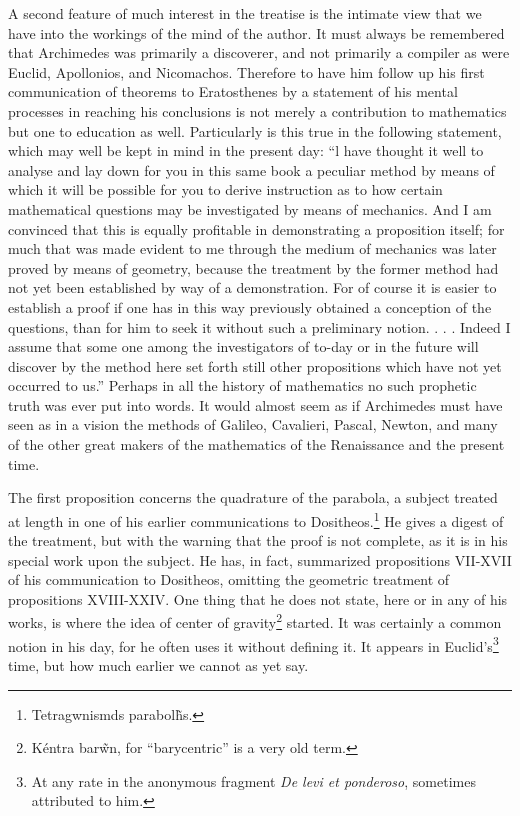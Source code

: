 \documentclass[12pt]{article}
\begin{document}
A second feature of much interest in the treatise is the intimate view
that we have into the workings of the mind of the author. It must
always be remembered that Archimedes was primarily a discoverer, and
not primarily a compiler as were Euclid, Apollonios, and Nicomachos.
Therefore to have him follow up his first communication of theorems to
Eratosthenes by a statement of his mental processes in reaching his
conclusions is not merely a contribution to mathematics but one to
education as well. Particularly is this true in the following
statement, which may well be kept in mind in the present day: ``l have
thought it well to analyse and lay down for you in this same book a
peculiar method by means of which it will be possible for you to
derive instruction as to how certain mathematical questions may be
investigated by means of mechanics. And I am convinced that this is
equally profitable in demonstrating a proposition itself; for much
that was made evident to me through the medium of mechanics was later
proved by means of geometry, because the treatment by the former
method had not yet been established by way of a demonstration. For of
course it is easier to establish a proof if one has in this way
previously obtained a conception of the questions, than for him to
seek it without such a preliminary notion. .  . . Indeed I assume that
some one among the investigators of to-day or in the future will
discover by the method here set forth still other propositions which
have not yet occurred to us.'' Perhaps in all the history of
mathematics no such prophetic truth was ever put into words.  It would
almost seem as if Archimedes must have seen as in a vision the methods
of Galileo, Cavalieri, Pascal, Newton, and many of the other great
makers of the mathematics of the Renaissance and the present time.

The first proposition concerns the quadrature of the parabola, a
subject treated at length in one of his earlier communications to
Dositheos.\footnote{ Tetragwnismds parabol\~hs.}
He gives a digest of the treatment, but with the warning that the
proof is not complete, as it is in his special work upon the
subject. He has, in fact, summarized propositions VII-XVII of his
communication to Dositheos, omitting the geometric treatment of
propositions XVIII-XXIV.  One thing that he does not state, here or in
any of his works, is where the idea of center of
gravity\footnote{ K\'entra bar\~wn,
 for ``barycentric'' is a very old term.}
started. It was certainly a common notion in his day, for he often
uses it without defining it. It appears in Euclid's\footnote{At any
rate in the anonymous fragment \emph{De levi et ponderoso}, sometimes
attributed to him.} time, but how much earlier we cannot as yet say.
\end{document}
